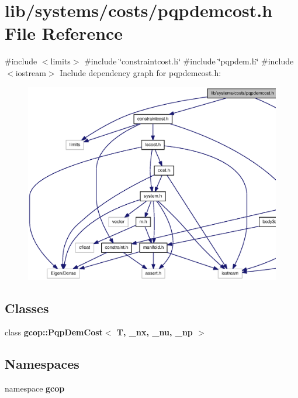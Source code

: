\section{lib/systems/costs/pqpdemcost.h \-File \-Reference}
\label{pqpdemcost_8h}
{\ttfamily \#include $<$limits$>$}\*
{\ttfamily \#include \char`\"{}constraintcost.\-h\char`\"{}}\*
{\ttfamily \#include \char`\"{}pqpdem.\-h\char`\"{}}\*
{\ttfamily \#include $<$iostream$>$}\*
\-Include dependency graph for pqpdemcost.\-h\-:
\nopagebreak
\begin{figure}[H]
\begin{center}
\leavevmode
\includegraphics[width=350pt]{pqpdemcost_8h__incl}
\end{center}
\end{figure}
\subsection*{\-Classes}
\begin{DoxyCompactItemize}
\item 
class {\bf gcop\-::\-Pqp\-Dem\-Cost$<$ T, \-\_\-nx, \-\_\-nu, \-\_\-np $>$}
\end{DoxyCompactItemize}
\subsection*{\-Namespaces}
\begin{DoxyCompactItemize}
\item 
namespace {\bf gcop}
\end{DoxyCompactItemize}
